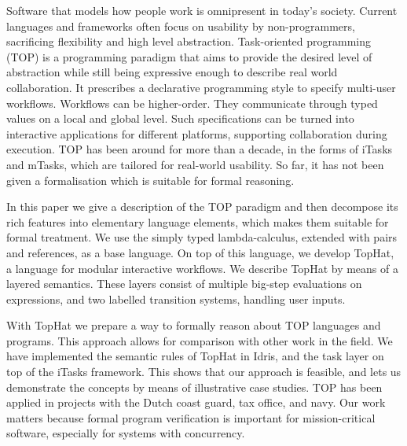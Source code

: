
Software that models how people work is omnipresent in today's society.
Current languages and frameworks often focus on usability by non-programmers, sacrificing flexibility and high level abstraction.
Task-oriented programming (TOP) is a programming paradigm that aims to provide the desired level of abstraction while still being expressive enough to describe real world collaboration.
It prescribes a declarative programming style to specify multi-user workflows.
Workflows can be higher-order.
They communicate through typed values on a local and global level.
Such specifications can be turned into interactive applications for different platforms, supporting collaboration during execution.
TOP has been around for more than a decade, in the forms of iTasks and mTasks, which are tailored for real-world usability.
So far, it has not been given a formalisation which is suitable for formal reasoning.

In this paper we give a description of the TOP paradigm and then decompose its rich features into elementary language elements, which makes them suitable for formal treatment.
We use the simply typed lambda-calculus, extended with pairs and references, as a base language.
On top of this language, we develop TopHat, a language for modular interactive workflows.
We describe TopHat by means of a layered semantics.
These layers consist of multiple big-step evaluations on expressions, and two labelled transition systems, handling user inputs.

With TopHat we prepare a way to formally reason about TOP languages and programs.
This approach allows for comparison with other work in the field.
We have implemented the semantic rules of TopHat in Idris, and the task layer on top of the iTasks framework.
This shows that our approach is feasible, and lets us demonstrate the concepts by means of illustrative case studies.
TOP has been applied in projects with the Dutch coast guard, tax office, and navy.
Our work matters because formal program verification is important for mission-critical software, especially for systems with concurrency.



